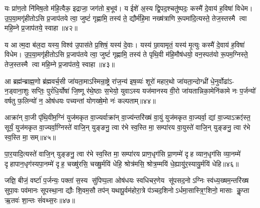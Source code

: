 {\anuvakamend[{अशान्तस्सुषुवा॒णेनैक॑चत्वारिशच्च॥15॥}]}

यः प्रा॑ण॒तो नि॑मिष॒तो म॑हि॒त्वैक॒ इद्राजा॒ जग॑तो ब॒भूव॑। य ईशे॑ अ॒स्य द्वि॒पद॒श्चतु॑ष्पदः॒ कस्मै॑ दे॒वाय॑ ह॒विषा॑ विधेम। उ॒प॒या॒मगृ॑हीतोऽसि प्र॒जाप॑तये त्वा॒ जुष्टं॑ गृह्णामि॒ तस्य॑ ते॒ द्यौर्म॑हि॒मा नख्ष॑त्राणि रू॒पमा॑दि॒त्यस्ते॒ तेज॒स्तस्मै त्वा महि॒म्ने प्र॒जाप॑तये॒ स्वाहा॥४२॥

{\anuvakamend[{यः प्रा॑ण॒तो द्यौरा॑दि॒त्योऽष्टात्रिꣳ॑शत्॥16॥}]}

य आत्म॒दा ब॑ल॒दा यस्य॒ विश्व॑ उ॒पास॑ते प्र॒शिषं॒ यस्य॑ दे॒वाः। यस्य॑ छा॒यामृतं॒ यस्य॑ मृ॒त्युः कस्मै॑ दे॒वाय॑ ह॒विषा॑ विधेम। उ॒प॒या॒मगृ॑हीतोऽसि प्र॒जाप॑तये त्वा॒ जुष्टं॑ गृह्णामि॒ तस्य॑ ते पृथि॒वी म॑हि॒मौष॑धयो॒ वन॒स्पत॑यो रू॒पम॒ग्निस्ते॒ तेज॒स्तस्मै त्वा महि॒म्ने प्र॒जाप॑तये॒ स्वाहा॥४३॥

{\anuvakamend[{य आत्म॒दाः पृ॑थि॒व्य॑ग्निरेका॒न्नच॑त्वारि॒ꣳ॒शत्॥17॥}]}

आ ब्रह्म॑न्ब्राह्म॒णो ब्र॑ह्मवर्च॒सी जा॑यता॒माऽस्मिन्रा॒ष्ट्रे रा॑ज॒न्य॑ इष॒व्यः॑ शूरो॑ महार॒थो जा॑यता॒न्दोग्ध्री॑ धे॒नुर्वोढा॑ऽ- न॒ड्वाना॒शुः सप्तिः॒ पुरं॑धि॒र्योषा॑ जि॒ष्णू र॑थे॒ष्ठाः स॒भेयो॒ युवाऽस्य यज॑मानस्य वी॒रो जा॑यतान्निका॒मेनि॑कामे नः प॒र्जन्यो॑ वर्\mbox{}षतु फ॒लिन्यो॑ न॒ ओष॑धयः पच्यन्तां योगख्षे॒मो नः॑ कल्पताम्॥४४॥

{\anuvakamend[{आ ब्रह्म॒न्नेक॑चत्वारिशत्॥18॥}]}

आक्रा॑न् वा॒जी पृ॑थि॒वीम॒ग्निं युज॑मकृत वा॒ज्यर्वाक्रा॑न् वा॒ज्य॑न्तरि॑ख्षं वा॒युं युज॑मकृत वा॒ज्यर्वा॒ द्यां वा॒ज्याऽक्रꣵ॑स्त॒ सूर्यं॒ युज॑मकृत वा॒ज्यर्वा॒ग्निस्ते॑ वाजि॒न् युङ्ङनु॒ त्वा र॑भे स्व॒स्ति मा॒ सम्पा॑रय वा॒युस्ते॑ वाजि॒न् युङ्ङनु॒ त्वा र॑भे स्व॒स्ति मा॒ सम्॥४५॥

पा॒र॒यादि॒त्यस्ते॑ वाजि॒न् युङ्ङनु॒ त्वा र॑भे स्व॒स्ति मा॒ सम्पा॑रय प्राण॒धृग॑सि प्रा॒णम्मे॑ दृह व्यान॒धृग॑सि व्या॒नम्मे॑ दृहापान॒धृग॑स्यपा॒नम्मे॑ दृह॒ चख्षु॑रसि॒ चख्षु॒र्मयि॑ धेहि॒ श्रोत्र॑मसि॒ श्रोत्र॒म्मयि॑ धे॒ह्यायु॑र॒स्यायु॒र्मयि॑ धेहि॥४६॥

{\anuvakamend[{वा॒युस्ते॑ वाजि॒न् युङ्ङनु॒ त्वा र॑भे स्व॒स्ति मा॒ सन्त्रिच॑त्वारिशच्च॥19॥}]}

जज्ञि॒ बीजं॒ वर्\mbox{}ष्टा॑ प॒र्जन्यः॒ पक्ता॑ स॒स्य सु॑पिप्प॒ला ओष॑धयः स्वधिचर॒णेय सू॑पसद॒नोऽग्निः स्व॑ध्य॒ख्षम॒न्तरि॑ख्ष सुपा॒वः पव॑मानः सूपस्था॒ना द्यौः शि॒वम॒सौ तप॑न् यथापू॒र्वम॑होरा॒त्रे प॑ञ्चद॒शिनोऽर्धमा॒सास्त्रि॒ꣳ॒शिनो॒ मासाः कॢ॒प्ता ऋ॒तवः॑ शा॒न्तः सं॑वथ्स॒रः॥४७॥

{\anuvakamend[{जज्ञि॒ बीज॒मेक॑त्रिशत्॥20॥}]}

